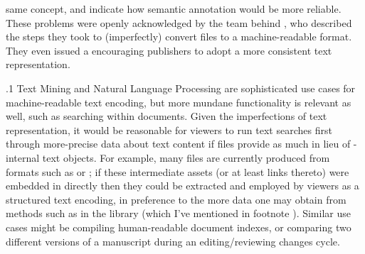 \documentclass[11pt, twocolumn]{article}
\begin{document}
{{same concept, and indicate how semantic
annotation would be more reliable.} These problems
were openly acknowledged by the team behind \CORDOneNine{}, who
described the steps they took to (imperfectly) convert
 files to a machine-readable  format. They even issued
a  encouraging publishers to adopt a
more consistent text representation.\thispagestyle{empty}
}%

\p.1{%
Text Mining and Natural Language Processing are sophisticated
use cases for machine-readable text encoding, but more
mundane functionality is relevant as well, such as searching
within  documents. Given the imperfections of
 text representation, it would be
reasonable for 
 viewers to run text searches first through more-precise data about
text content \mdash{} if  files provide as much \mdash{} in lieu of
-internal text objects. For example, many  files are
currently produced from  formats such as
 or ; if these intermediate assets (or at least
links thereto) were embedded in
 directly then they could be extracted and employed by
 viewers as a structured text encoding, in preference to the
more  data one may obtain from
methods such as  in the  library
(which I've mentioned in footnote ).
Similar use cases might be compiling human-readable document
indexes, or comparing two different versions of a manuscript
during an editing/reviewing changes cycle.
}%
\end{document}
